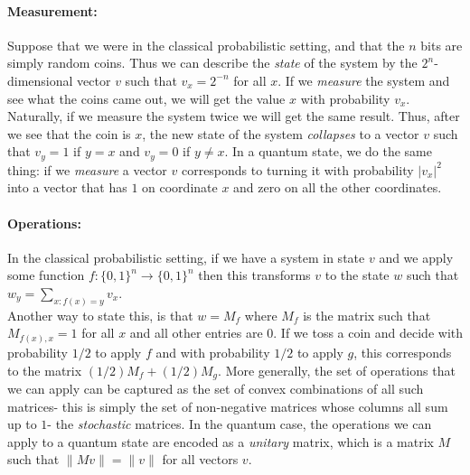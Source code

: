 \paragraph{Measurement:} Suppose that we were in the classical
probabilistic setting, and that the \(n\) bits are simply random coins.
Thus we can describe the \emph{state} of the system by the
\(2^n\)-dimensional vector \(v\) such that \(v_x=2^{-n}\) for all \(x\).
If we \emph{measure} the system and see what the coins came out, we will
get the value \(x\) with probability \(v_x\). Naturally, if we measure
the system twice we will get the same result. Thus, after we see that
the coin is \(x\), the new state of the system \emph{collapses} to a
vector \(v\) such that \(v_y = 1\) if \(y=x\) and \(v_y=0\) if
\(y\neq x\). In a quantum state, we do the same thing: if we
\emph{measure} a vector \(v\) corresponds to turning it with probability
\(|v_x|^2\) into a vector that has \(1\) on coordinate \(x\) and zero on
all the other coordinates.

\paragraph{Operations:} In the classical probabilistic setting, if we
have a system in state \(v\) and we apply some function
\(f:\{0,1\}^n\rightarrow\{0,1\}^n\) then this transforms \(v\) to the
state \(w\) such that \(w_y = \sum_{x:f(x)=y} v_x\).\\
Another way to state this, is that \(w=M_f\) where \(M_f\) is the matrix
such that \(M_{f(x),x}=1\) for all \(x\) and all other entries are
\(0\). If we toss a coin and decide with probability \(1/2\) to apply
\(f\) and with probability \(1/2\) to apply \(g\), this corresponds to
the matrix \((1/2)M_f + (1/2)M_g\). More generally, the set of
operations that we can apply can be captured as the set of convex
combinations of all such matrices- this is simply the set of
non-negative matrices whose columns all sum up to \(1\)- the
\emph{stochastic} matrices. In the quantum case, the operations we can
apply to a quantum state are encoded as a \emph{unitary} matrix, which
is a matrix \(M\) such that \(\|Mv\|=\|v\|\) for all vectors \(v\).

